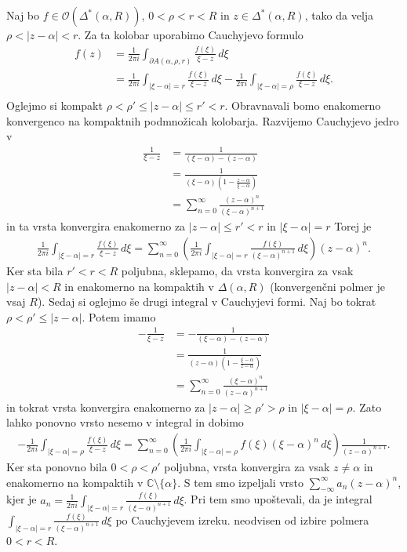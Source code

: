 \documentclass[10pt, a4paper]{article}
\newcommand{\C}{\mathbb {C}}
\begin{document}
Naj bo $f \in \mathcal{O} (\Delta^* (\alpha, R))$, $0 < \rho < r < R$ in
$z \in \Delta^* (\alpha, R)$, tako da velja $\rho < |z - \alpha| < r$.
Za ta kolobar uporabimo Cauchyjevo formulo
\begin{align*}
  f(z) &= \frac{1}{2 \pi i} \int_{\partial A(\alpha, \rho, r)} \frac{f(\xi)}{\xi - z}\, d\xi \\
  &= \frac{1}{2 \pi i} \int_{|\xi - \alpha| = r} \frac{f(\xi)}{\xi - z}\, d\xi - \frac{1}{2 \pi i} \int_{|\xi - \alpha| = \rho} \frac{f(\xi)}{\xi - z}\, d\xi.\\
\end{align*}
Oglejmo si kompakt $\rho < \rho' \leq |z - \alpha| \leq r' < r$.
Obravnavali bomo enakomerno konvergenco na kompaktnih podmnožicah kolobarja.
Razvijemo Cauchyjevo jedro v 
\begin{align*}
  \frac{1}{\xi - z} &= \frac{1}{(\xi - \alpha) - (z - \alpha)}\\
  &= \frac{1}{(\xi - \alpha) (1 - \frac{z - \alpha}{\xi - \alpha})}\\
  &= \sum_{n = 0} ^\infty \frac{(z - \alpha)^n}{(\xi - \alpha)^{n + 1}}
\end{align*}
in ta vrsta konvergira enakomerno za $|z - \alpha| \leq r' < r$ in $|\xi - \alpha| = r$
Torej je 
\begin{align*}
  \frac{1}{2 \pi i} \int_{|\xi - \alpha| = r} \frac{f(\xi)}{\xi - z}\, d\xi = \sum_{n = 0} ^\infty \left(\frac{1}{2 \pi i} \int_{|\xi - \alpha| = r} \frac{f(\xi)}{(\xi - \alpha)^{n + 1}}\, d\xi\right) (z - \alpha)^n.
\end{align*}
Ker sta bila $r' < r < R$ poljubna, sklepamo, da vrsta konvergira za vsak $|z - \alpha| < R$
in enakomerno na kompaktih v $\Delta(\alpha, R)$ (konvergenčni polmer je vsaj $R$).
Sedaj si oglejmo še drugi integral v Cauchyjevi formi.
Naj bo tokrat $\rho < \rho' \leq |z - \alpha|$. Potem imamo 
\begin{align*}
  -\frac{1}{\xi - z} &= -\frac{1}{(\xi - \alpha) - (z - \alpha)}\\
  &= \frac{1}{(z - \alpha) (1 - \frac{\xi - \alpha}{z - \alpha})}\\
  &= \sum_{n = 0} ^\infty \frac{(\xi - \alpha)^n}{(z - \alpha)^{n + 1}}
\end{align*}
in tokrat vrsta konvergira enakomerno za $|z - \alpha| \geq \rho' > \rho$ in $|\xi - \alpha| = \rho$.
Zato lahko ponovno vrsto nesemo v integral in dobimo 
\begin{align*}
  -\frac{1}{2 \pi i} \int_{|\xi - \alpha| = \rho} \frac{f(\xi)}{\xi - z}\, d\xi = \sum_{n = 0} ^\infty \left(\frac{1}{2 \pi i} \int_{|\xi - \alpha| = \rho} {f(\xi)}{(\xi - \alpha)^{n}}\, d\xi\right) \frac{1}{(z - \alpha)^{n+1}}.
\end{align*}
Ker sta ponovno bila $0 < \rho < \rho'$ poljubna, vrsta konvergira za vsak $z \neq \alpha$
in enakomerno na kompaktih v $\C \setminus \{\alpha\}$.
S tem smo izpeljali vrsto 
$\sum_{-\infty} ^\infty a_n (z - \alpha)^n$, kjer je $a_n = \frac{1}{2 \pi i} \int_{|\xi - \alpha| = r} \frac{f(\xi)}{(\xi - \alpha)^{n + 1}}\, d\xi$. 
Pri tem smo upoštevali, da je integral $\int_{|\xi - \alpha| = r} \frac{f(\xi)}{(\xi - \alpha)^{n + 1}}\, d\xi$ po Cauchyjevem izreku. 
neodvisen od izbire polmera $0 < r< R$.
\end{document}
